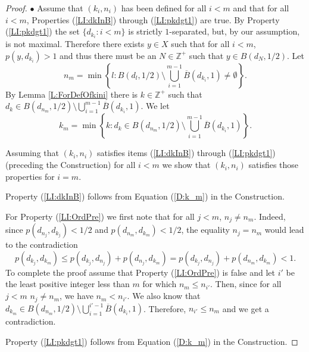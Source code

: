 \documentclass[11pt, reqno]{amsart}
\theoremstyle{definition}
\numberwithin{theorem}{section}
\theoremstyle{definition}
\theoremstyle{definition}
\theoremstyle{definition}
\theoremstyle{definition}
\theoremstyle{definition}
\numberwithin{claim}{section}
\theoremstyle{definition}
\theoremstyle{definition}
\theoremstyle{definition}
\theoremstyle{definition}
\theoremstyle{definition}
\theoremstyle{remboldstyle}
\begin{document}
\begin{proof}
$\bullet$ Assume that $(k_i, n_i)$ has been defined for all $i < m$ and that for all $i < m$, Properties (\ref{LI:dkInB}) through (\ref{LI:pkdgt1}) are true.  By Property (\ref{LI:pkdgt1}) the set $\{ d_{k_i} : i < m \}$ is strictly $1$-separated, but, by our assumption, is not maximal.  Therefore there exists $ y  \in X$ such that for all $i < m$, $p(y, d_{k_i}) > 1$ and thus there must be an $N \in \mathbb{Z}^+$ such that $y \in B(d_N, 1/2)$.  Let 
\begin{equation} \label{D:n_m}
 n_m = \min \left\{ l: B(d_l, 1/2) \setminus \bigcup_{i=1}^{m-1}\overline{B}(d_{k_i},1) \neq \emptyset \right\}. 
\end{equation}
  By Lemma \ref{L:ForDefOfkini} there is $k \in \mathbb{Z}^+$ such that $d_k \in B(d_{n_m}, 1/2) \setminus \bigcup_{i=1}^{m-1}\overline{B}(d_{k_i},1)$.  We let 
\begin{equation}  \label{D:k_m}
  k_m= \min \left\{ k: d_k \in B(d_{n_m}, 1/2) \setminus \bigcup_{i=1}^{m-1}\overline{B}(d_{k_i},1) \right\}.
\end{equation}  

Assuming that $(k_i, n_i)$ satisfies items (\ref{LI:dkInB}) through (\ref{LI:pkdgt1}) (preceding the Construction) for all $i < m$ we show that $(k_i, n_i)$ satisfies those properties for $i = m$.

Property (\ref{LI:dkInB}) follows from Equation (\ref{D:k_m}) in the Construction.  


For Property (\ref{LI:OrdPre}) we first note that for all $j < m$, $n_j \ne n_m$.  Indeed, since $p(d_{n_j}, d_{k_j}) <1/2$ and $p(d_{n_m}, d_{k_m}) < 1/2$, the equality $n_j = n_m$ would lead to the contradiction 
\[
p(d_{k_j}, d_{k_m}) \le p(d_{k_j}, d_{n_j}) + p(d_{n_j}, d_{k_m}) = p(d_{k_j}, d_{n_j}) + p(d_{n_m}, d_{k_m}) < 1.
\]
 To complete the proof assume that Property (\ref{LI:OrdPre}) is false and let $i'$ be the least positive integer less than $m$ for which $n_m \le n_{i'}$.  Then, since for all $j <m$ $n_j \ne n_m$, we have $n_m < n_{i'}$.  We also know that $d_{k_m}\in  B(d_{n_m}, 1/2) \setminus \bigcup_{i=1}^{i'-1}\overline{B}(d_{k_i},1) $. Therefore, $ n_{i'} \le n_m$ and we get a contradiction.

Property (\ref{LI:pkdgt1}) follows from Equation (\ref{D:k_m}) in the Construction.


\end{proof}
\end{document}
